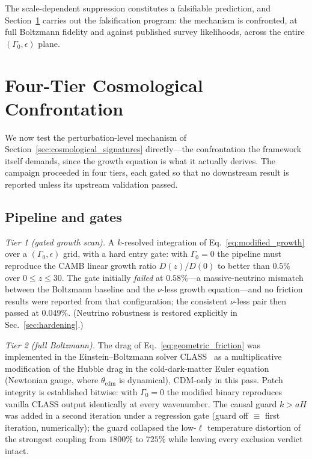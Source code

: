 \documentclass[aps,prd,twocolumn,superscriptaddress,nofootinbib]{revtex4-2}
\theoremstyle{definition}
\theoremstyle{remark}
\begin{document}
The scale-dependent suppression constitutes a falsifiable prediction,
and Section~\ref{sec:confrontation} carries out the falsification
program: the mechanism is confronted, at full Boltzmann fidelity and
against published survey likelihoods, across the entire
$(\Gamma_0, \epsilon)$ plane.


\section{Four-Tier Cosmological Confrontation}
\label{sec:confrontation}

We now test the perturbation-level mechanism of
Section~\ref{sec:cosmological_signatures} directly---the confrontation
the framework itself demands, since the growth equation is what it
actually derives. The campaign proceeded in four tiers, each gated so
that no downstream result is reported unless its upstream validation
passed.

\subsection{Pipeline and gates}

\emph{Tier 1 (gated growth scan).} A $k$-resolved integration of
Eq.~\eqref{eq:modified_growth} over a $(\Gamma_0, \epsilon)$ grid,
with a hard entry gate: with $\Gamma_0 = 0$ the pipeline must reproduce
the CAMB linear growth ratio $D(z)/D(0)$ to better than $0.5\%$ over
$0 \le z \le 30$. The gate initially \emph{failed} at $0.58\%$---a
massive-neutrino mismatch between the Boltzmann baseline and the
$\nu$-less growth equation---and no friction results were reported from
that configuration; the consistent $\nu$-less pair then passed at
$0.049\%$. (Neutrino robustness is restored explicitly in
Sec.~\ref{sec:hardening}.)

\emph{Tier 2 (full Boltzmann).} The drag of
Eq.~\eqref{eq:geometric_friction} was implemented in the
Einstein--Boltzmann solver CLASS~\cite{CLASS2011} as a multiplicative
modification of the Hubble drag in the cold-dark-matter Euler equation
(Newtonian gauge, where $\theta_{\mathrm{cdm}}$ is dynamical),
CDM-only in this pass. Patch integrity is established bitwise: with
$\Gamma_0 = 0$ the modified binary reproduces vanilla CLASS output
identically at every wavenumber. The causal guard $k > aH$ was added in
a second iteration under a regression gate (guard off $\equiv$ first
iteration, numerically); the guard collapsed the low-$\ell$ temperature
distortion of the strongest coupling from $1800\%$ to $725\%$ while
leaving every exclusion verdict intact.
\end{document}
